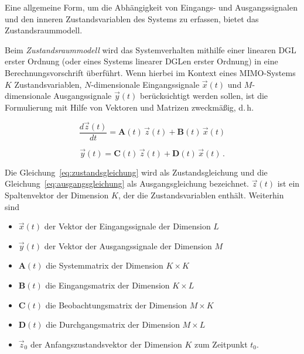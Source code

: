 Eine allgemeine Form, um die Abhängigkeit von Eingangs- und Ausgangssignalen und den inneren Zustandsvariablen des Systems zu erfassen, bietet das Zustandsraummodell.

\begin{definition}[Zustandsraummodell]
Beim \textit{Zustandsraummodell} wird das Systemverhalten mithilfe einer linearen DGL erster Ordnung (oder eines Systems linearer DGLen erster Ordnung) in eine Berechnungsvorschrift überführt. Wenn hierbei im Kontext eines MIMO-Systems $K$ Zustandsvariablen, $N$-dimensionale Eingangssignale $\vec{x}(t)$ und $M$-dimensionale Ausgangssignale $\vec{y}(t)$ berücksichtigt werden sollen, ist die Formulierung mit Hilfe von Vektoren und Matrizen zweckmäßig, d.\,h.

\begin{equation}
\frac{d\vec{z}(t)}{dt} = \mathbf{A}(t)\,\vec{z}(t) + \mathbf{B}(t)\,\vec{x}(t)
\label{eq:zustandsgleichung}
\end{equation}

\begin{equation}
\vec{y}(t) = \mathbf{C}(t)\,\vec{z}(t) + \mathbf{D}(t)\,\vec{x}(t)\,.
\label{eq:ausgangsgleichung}
\end{equation}

Die Gleichung~\eqref{eq:zustandsgleichung} wird als Zustandsgleichung und die Gleichung~\eqref{eq:ausgangsgleichung} als Ausgangsgleichung bezeichnet. $\vec{z}(t)$ ist ein Spaltenvektor der Dimension $K$, der die Zustandsvariablen enthält. Weiterhin sind

\begin{itemize}
  \item $\vec{x}(t)$ \quad der Vektor der Eingangssignale der Dimension $L$
  \item $\vec{y}(t)$ \quad der Vektor der Ausgangssignale der Dimension $M$
  \item $\mathbf{A}(t)$ \quad die Systemmatrix der Dimension $K \times K$
  \item $\mathbf{B}(t)$ \quad die Eingangsmatrix der Dimension $K \times L$
  \item $\mathbf{C}(t)$ \quad die Beobachtungsmatrix der Dimension $M \times K$
  \item $\mathbf{D}(t)$ \quad die Durchgangsmatrix der Dimension $M \times L$
  \item $\vec{z}_0$ \quad der Anfangszustandsvektor der Dimension $K$ zum Zeitpunkt $t_0$.
\end{itemize}
\end{definition}

